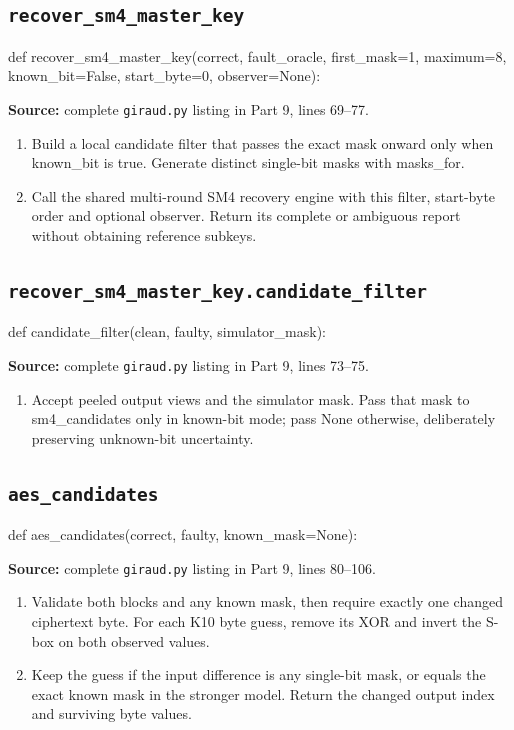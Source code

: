 \subsection{\texttt{recover\_\allowbreak{}sm4\_\allowbreak{}master\_\allowbreak{}key}}
\begin{lightcode}
def recover_sm4_master_key(correct, fault_oracle, first_mask=1, maximum=8, known_bit=False, start_byte=0, observer=None):
\end{lightcode}
\noindent\textbf{Source:} complete \texttt{giraud.py} listing in Part 9, lines 69--77.
\begin{enumerate}
\item Build a local candidate filter that passes the exact mask onward only when known\_bit is true. Generate distinct single-bit masks with masks\_for.
\item Call the shared multi-round SM4 recovery engine with this filter, start-byte order and optional observer. Return its complete or ambiguous report without obtaining reference subkeys.
\end{enumerate}
\subsection{\texttt{recover\_\allowbreak{}sm4\_\allowbreak{}master\_\allowbreak{}key.candidate\_\allowbreak{}filter}}
\begin{lightcode}
def candidate_filter(clean, faulty, simulator_mask):
\end{lightcode}
\noindent\textbf{Source:} complete \texttt{giraud.py} listing in Part 9, lines 73--75.
\begin{enumerate}
\item Accept peeled output views and the simulator mask. Pass that mask to sm4\_candidates only in known-bit mode; pass None otherwise, deliberately preserving unknown-bit uncertainty.
\end{enumerate}
\subsection{\texttt{aes\_\allowbreak{}candidates}}
\begin{lightcode}
def aes_candidates(correct, faulty, known_mask=None):
\end{lightcode}
\noindent\textbf{Source:} complete \texttt{giraud.py} listing in Part 9, lines 80--106.
\begin{enumerate}
\item Validate both blocks and any known mask, then require exactly one changed ciphertext byte. For each K10 byte guess, remove its XOR and invert the S-box on both observed values.
\item Keep the guess if the input difference is any single-bit mask, or equals the exact known mask in the stronger model. Return the changed output index and surviving byte values.
\end{enumerate}
